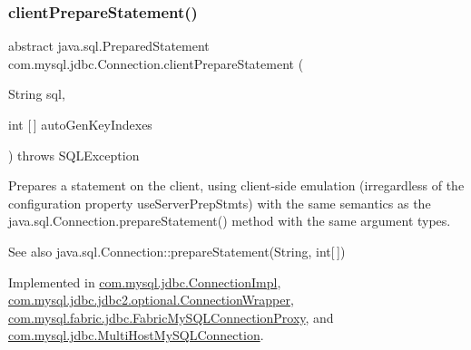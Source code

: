 \subsubsection{\texorpdfstring{client\+Prepare\+Statement()}{clientPrepareStatement()}\hspace{0.1cm}{\footnotesize\ttfamily [4/6]}}
{\footnotesize\ttfamily abstract java.\+sql.\+Prepared\+Statement com.\+mysql.\+jdbc.\+Connection.\+client\+Prepare\+Statement (\begin{DoxyParamCaption}\item[{String}]{sql,  }\item[{int \mbox{[}$\,$\mbox{]}}]{auto\+Gen\+Key\+Indexes }\end{DoxyParamCaption}) throws S\+Q\+L\+Exception\hspace{0.3cm}{\ttfamily [abstract]}}

Prepares a statement on the client, using client-\/side emulation (irregardless of the configuration property \textquotesingle{}use\+Server\+Prep\+Stmts\textquotesingle{}) with the same semantics as the java.\+sql.\+Connection.\+prepare\+Statement() method with the same argument types.

\begin{DoxySeeAlso}{See also}
java.\+sql.\+Connection\+::prepare\+Statement(\+String, int\mbox{[}$\,$\mbox{]}) 
\end{DoxySeeAlso}


Implemented in \mbox{\hyperlink{classcom_1_1mysql_1_1jdbc_1_1_connection_impl_a7c16e87fcf61b55c5737bd2f041a847a}{com.\+mysql.\+jdbc.\+Connection\+Impl}}, \mbox{\hyperlink{classcom_1_1mysql_1_1jdbc_1_1jdbc2_1_1optional_1_1_connection_wrapper_a2553dc69e9e6f8026ed0bf4911a9e417}{com.\+mysql.\+jdbc.\+jdbc2.\+optional.\+Connection\+Wrapper}}, \mbox{\hyperlink{classcom_1_1mysql_1_1fabric_1_1jdbc_1_1_fabric_my_s_q_l_connection_proxy_ad03b65c83fb47a910ad616cc4fd360dd}{com.\+mysql.\+fabric.\+jdbc.\+Fabric\+My\+S\+Q\+L\+Connection\+Proxy}}, and \mbox{\hyperlink{classcom_1_1mysql_1_1jdbc_1_1_multi_host_my_s_q_l_connection_a943b6c7d2931f82f72806b47271f259c}{com.\+mysql.\+jdbc.\+Multi\+Host\+My\+S\+Q\+L\+Connection}}.

\mbox{\label{interfacecom_1_1mysql_1_1jdbc_1_1_connection_af2c3e5b2cd7768c4fdf7ca4e75558bbf}} 
